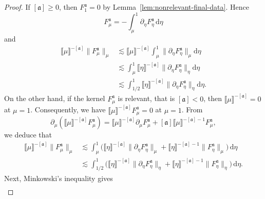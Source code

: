 \documentclass{article}
\numberwithin{equation}{section}
\newcommand{\mathd}{\mathrm{d}}
\theoremstyle{plain}
\theoremstyle{definition}
\begin{document}
\begin{proof}
  If $[\mathfrak{a}] \geqslant 0$, then
  $F_1^{\mathfrak{a}} = 0$ by Lemma~\ref{lem:nonrelevant-final-data}. Hence
  \[
    F^{\mathfrak{a}}_{\mu}
    = - \int_{\mu}^1 \partial_{\eta} F^{\mathfrak{a}}_{\eta}\,\mathd \eta
  \]
  and
  \begin{align*}
     \llbracket \mu \rrbracket^{- [\mathfrak{a}]}
     \| F^{\mathfrak{a}}_{\mu} \|_{\mu}
     &\lesssim \llbracket \mu \rrbracket^{- [\mathfrak{a}]}
     \int_{\mu}^1 \| \partial_{\eta} F^{\mathfrak{a}}_{\eta} \|_{\mu}
     \mathd \eta\\
     &\lesssim \int_{\mu}^1
     \llbracket \eta \rrbracket^{- [\mathfrak{a}]}
     \| \partial_{\eta} F^{\mathfrak{a}}_{\eta} \|_{\eta} \mathd \eta\\
     &\lesssim \int_{1 / 2}^1
     \llbracket \eta \rrbracket^{- [\mathfrak{a}]}
     \| \partial_{\eta} F^{\mathfrak{a}}_{\eta} \|_{\eta} \mathd \eta .
  \end{align*}
  On the other hand, if the kernel $F^{\mathfrak{a}}_{\mu}$ is relevant, that
  is $[\mathfrak{a}] < 0$, then $\llbracket \mu \rrbracket^{- [\mathfrak{a}]} = 0$ at $\mu =
  1$. Consequently, we have $\llbracket \mu \rrbracket^{- [\mathfrak{a}]}
  F^{\mathfrak{a}}_{\mu} = 0$ at $\mu = 1$. From
  \begin{equation}
    \partial_{\mu} (\llbracket \mu \rrbracket^{- [\mathfrak{a}]}
    F^{\mathfrak{a}}_{\mu}) = \llbracket \mu \rrbracket^{- [\mathfrak{a}]}
    \partial_{\mu} F^{\mathfrak{a}}_{\mu} + [\mathfrak{a}] 
    \llbracket \mu \rrbracket^{- [\mathfrak{a}] - 1} F^{\mathfrak{a}}_{\mu},
    \label{eq:F-rho-derivative}
  \end{equation}
  we deduce that
  \begin{align*}
    \llbracket \mu \rrbracket^{- [\mathfrak{a}]}
    \| F^{\mathfrak{a}}_{\mu} \|_{\mu}
    &\lesssim \int_{\mu}^1
    \bigl(\llbracket \eta \rrbracket^{- [\mathfrak{a}]}
    \| \partial_{\eta} F^{\mathfrak{a}}_{\eta} \|_{\mu}
    + \llbracket \eta \rrbracket^{- [\mathfrak{a}] - 1}
    \| F^{\mathfrak{a}}_{\eta} \|_{\mu}\bigr)\,\mathd \eta\\
    &\lesssim \int_{1 / 2}^1
    \bigl(\llbracket \eta \rrbracket^{- [\mathfrak{a}]}
    \| \partial_{\eta} F^{\mathfrak{a}}_{\eta} \|_{\eta}
    + \llbracket \eta \rrbracket^{- [\mathfrak{a}] - 1}
    \| F^{\mathfrak{a}}_{\eta} \|_{\eta}\bigr)\,\mathd \eta .
  \end{align*}
  Next, Minkowski's inequality gives
  \begin{align*}

\end{align*}
\end{proof}
\end{document}
